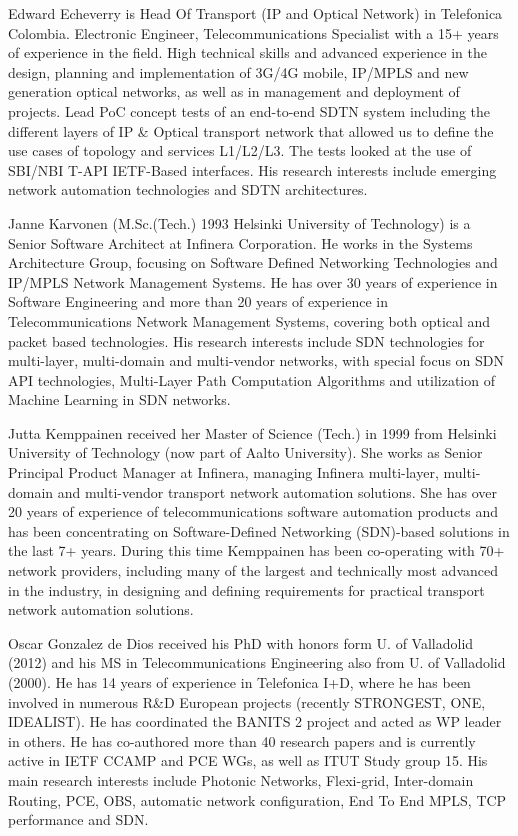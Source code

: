 \documentclass[a4paper,fleqn]{cas-dc}
\begin{document}
Edward Echeverry is Head Of Transport (IP and Optical Network) in Telefonica Colombia. Electronic Engineer, Telecommunications Specialist with a 15+ years of experience in the field. High technical skills and advanced experience in the design, planning and implementation of 3G/4G mobile, IP/MPLS and new generation optical networks, as well as in management and deployment of projects. Lead PoC concept tests of an end-to-end SDTN system including the different layers of IP \& Optical transport network that allowed us to define the use cases of topology and services L1/L2/L3. The tests looked at the use of SBI/NBI T-API IETF-Based interfaces. His research interests include emerging network automation technologies and SDTN architectures.
\endbio

Janne Karvonen (M.Sc.(Tech.) 1993 Helsinki University of Technology) is a Senior Software Architect at Infinera Corporation. He works in the Systems Architecture Group, focusing on Software Defined Networking Technologies and IP/MPLS Network Management Systems. He has over 30 years of experience in Software Engineering and more than 20 years of experience in Telecommunications Network Management Systems, covering both optical and packet based technologies. His research interests include SDN technologies for multi-layer, multi-domain and multi-vendor networks, with special focus on SDN API technologies, Multi-Layer Path Computation Algorithms and utilization of Machine Learning in SDN networks.
\endbio

Jutta Kemppainen received her Master of Science (Tech.) in 1999 from Helsinki University of Technology (now part of Aalto University). She works as Senior Principal Product Manager at Infinera, managing Infinera multi-layer, multi-domain and multi-vendor transport network automation solutions. She has over 20 years of experience of telecommunications software automation products and has been concentrating on Software-Defined Networking (SDN)-based solutions in the last 7+ years. During this time Kemppainen has been co-operating with 70+ network providers, including many of the largest and technically most advanced in the industry, in designing and defining requirements for practical transport network automation solutions.
\endbio


\endbio

\bio{}
Oscar Gonzalez de Dios received his PhD with honors form U. of Valladolid (2012) and his MS in Telecommunications Engineering also from U. of Valladolid (2000). He has 14 years of experience in Telefonica I+D, where he has been involved in numerous R&D European projects (recently STRONGEST, ONE, IDEALIST). He has coordinated the BANITS 2 project and acted as WP leader in others. He has co-authored more than 40 research papers and is currently active in IETF CCAMP and PCE WGs, as well as ITUT Study group 15. His main research interests include Photonic Networks, Flexi-grid, Inter-domain Routing, PCE, OBS, automatic network configuration, End To End MPLS, TCP performance and SDN.
\endbio
\end{document}
